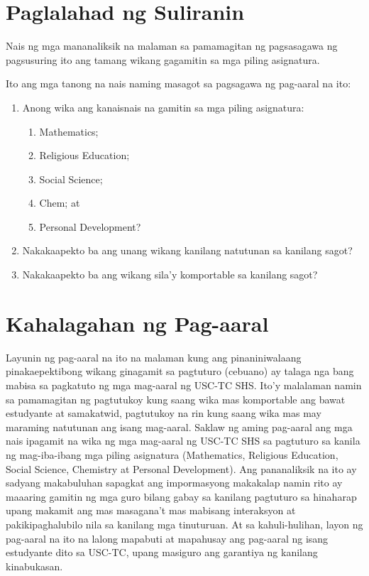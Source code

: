 \documentclass [british, 11pt] {report}
\begin{document}
\section {Paglalahad ng Suliranin}
Nais ng mga mananaliksik na malaman sa pamamagitan ng pagsasagawa ng pagsusuring
ito ang tamang wikang gagamitin sa mga piling asignatura.

Ito ang mga tanong na nais naming masagot sa pagsagawa ng pag-aaral na ito:
\begin{enumerate}[parsep=0.5\parskip,topsep=-0.5\parskip]
\item Anong wika ang kanaisnais na gamitin sa mga piling asignatura:
  \begin{enumerate}[nosep]
  \item Mathematics;
  \item Religious Education;
  \item Social Science;
  \item Chem; at
  \item Personal Development?
  \end{enumerate}
\item Nakakaapekto ba ang unang wikang kanilang natutunan sa kanilang sagot?
\item Nakakaapekto ba ang wikang sila'y komportable sa kanilang sagot?
\end{enumerate}


\section{Kahalagahan ng Pag-aaral}
Layunin ng pag-aaral na ito na malaman kung ang pinaniniwalaang pinakaepektibong
wikang ginagamit sa pagtuturo (\gls{cebuano}) ay talaga nga bang mabisa sa
pagkatuto ng mga mag-aaral ng USC-TC SHS. Ito'y malalaman namin sa pamamagitan
ng pagtutukoy kung saang wika mas komportable ang bawat estudyante at
samakatwid, pagtutukoy na rin kung saang wika mas may maraming natutunan ang
isang mag-aaral. Saklaw ng aming pag-aaral ang mga nais ipagamit na wika ng mga
mag-aaral ng USC-TC SHS sa pagtuturo sa kanila ng mag-iba-ibang mga piling
asignatura (Mathematics, Religious Education, Social Science, Chemistry at
Personal Development). Ang pananaliksik na ito ay sadyang makabuluhan sapagkat
ang impormasyong makakalap namin rito ay maaaring gamitin ng mga guro bilang
gabay sa kanilang pagtuturo sa hinaharap upang makamit ang mas masagana't mas
mabisang interaksyon at pakikipaghalubilo nila sa kanilang mga tinuturuan. At sa
kahuli-hulihan, layon ng pag-aaral na ito na lalong mapabuti at mapahusay ang
pag-aaral ng isang estudyante dito sa USC-TC, upang masiguro ang garantiya ng
kanilang kinabukasan.
\end{document}
